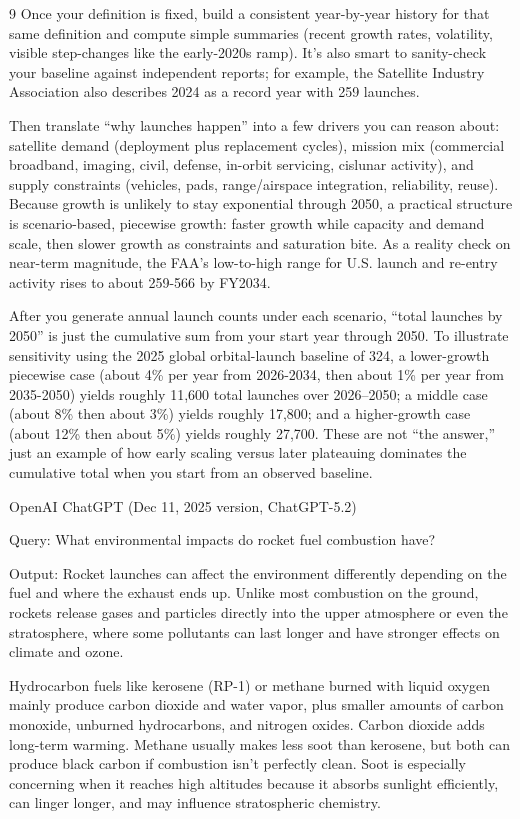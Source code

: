 \documentclass{mcmthesis}
\begin{document}
\begin{ReportAiUse}{9}
Once your definition is fixed, build a consistent year-by-year history for that same definition and compute simple summaries (recent growth rates, volatility, visible step-changes like the early-2020s ramp). It’s also smart to sanity-check your baseline against independent reports; for example, the Satellite Industry Association also describes 2024 as a record year with 259 launches.

Then translate “why launches happen” into a few drivers you can reason about: satellite demand (deployment plus replacement cycles), mission mix (commercial broadband, imaging, civil, defense, in-orbit servicing, cislunar activity), and supply constraints (vehicles, pads, range/airspace integration, reliability, reuse). Because growth is unlikely to stay exponential through 2050, a practical structure is scenario-based, piecewise growth: faster growth while capacity and demand scale, then slower growth as constraints and saturation bite. As a reality check on near-term magnitude, the FAA’s low-to-high range for U.S. launch and re-entry activity rises to about 259-566 by FY2034.

After you generate annual launch counts under each scenario, “total launches by 2050” is just the cumulative sum from your start year through 2050. To illustrate sensitivity using the 2025 global orbital-launch baseline of 324, a lower-growth piecewise case (about 4\% per year from 2026-2034, then about 1\% per year from 2035-2050) yields roughly 11,600 total launches over 2026–2050; a middle case (about 8\% then about 3\%) yields roughly 17,800; and a higher-growth case (about 12\% then about 5\%) yields roughly 27,700. These are not “the answer,” just an example of how early scaling versus later plateauing dominates the cumulative total when you start from an observed baseline.

OpenAI ChatGPT (Dec 11, 2025 version, ChatGPT-5.2)

Query: What environmental impacts do rocket fuel combustion have?

Output: Rocket launches can affect the environment differently depending on the fuel and where the exhaust ends up. Unlike most combustion on the ground, rockets release gases and particles directly into the upper atmosphere or even the stratosphere, where some pollutants can last longer and have stronger effects on climate and ozone.

Hydrocarbon fuels like kerosene (RP-1) or methane burned with liquid oxygen mainly produce carbon dioxide and water vapor, plus smaller amounts of carbon monoxide, unburned hydrocarbons, and nitrogen oxides. Carbon dioxide adds long-term warming. Methane usually makes less soot than kerosene, but both can produce black carbon if combustion isn’t perfectly clean. Soot is especially concerning when it reaches high altitudes because it absorbs sunlight efficiently, can linger longer, and may influence stratospheric chemistry.


\end{ReportAiUse}
\end{document}
